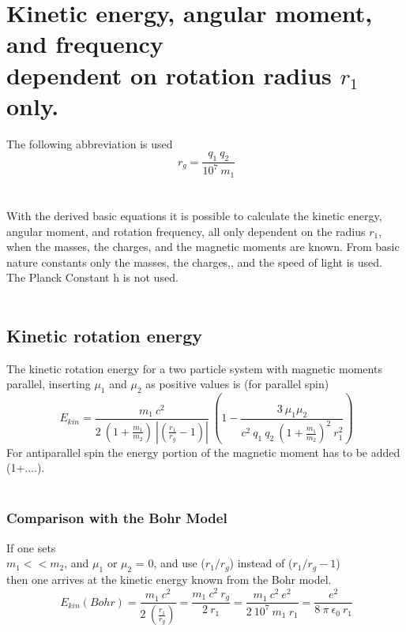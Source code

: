 \documentclass[10pt,titlepage]{article}
\begin{document}

\section{Kinetic energy, angular moment, and frequency \\dependent on rotation radius  $r_1$ only.}
The following abbreviation is used
\\
\begin{equation}
\ r_g=\frac{q_1 \ q_2}{10^7 \ m_1}
\end{equation}
\\\\
With the derived basic equations it is possible to calculate the kinetic energy, angular moment, and rotation frequency, all only dependent on the radius $r_1$, when the masses, the charges, and the magnetic moments are known. From basic nature constants only the masses, the charges,, and the speed of light is used. The Planck Constant h is not used.
\\\\



\subsection{Kinetic rotation energy}
The kinetic rotation energy for a two particle system with magnetic moments parallel, inserting $\mu_1$ and $\mu_2$ as positive values is (for parallel spin)
\\
\begin{equation}
\ E_{kin}=\frac{m_1 \ c^2}{2 \ (1+\frac{m_1}{m_2}) \   |(\frac{r_1}{r_g}-1)|}    \ (1-\frac{3 \ \mu_1  \mu_2}{c^2 \ q_1 \ q_2 \ (1+\frac{m_1}{m_2})^2 \ r_1^2})
\end{equation}
For antiparallel spin the energy portion of the magnetic moment has to be added (1+....).
\\\\


\subsubsection{Comparison with the Bohr Model}
If one sets \\
$m_1 << m_2$, and 
$\mu_1$ or $\mu_2$ = 0, and 
use ($r_1/r_g$) instead of ($r_1/r_g-1$)\\
then one arrives at the kinetic energy known from the Bohr model.\\
\begin{equation}
\ E_{kin}(Bohr)=\frac{m_1 \ c^2}{2 \   (\frac{r_1}{r_g})} = \frac{m_1 \ c^2 \ r_g}{2 \ r_1}= \frac{m_1 \ c^2 \ e^2}{2 \ 10^7 \ m_1 \ r_1}= \frac{e^2}{8 \ \pi \ \epsilon_0 \ r_1}
\end{equation}
\\\\
\end{document}
